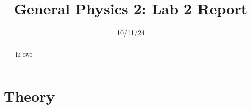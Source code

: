 \documentclass[11pt, letterpaper]{report}
\title{General Physics 2: Lab 2 Report}
\date{10/11/24}
\begin{document}
\maketitle
\begin{abstract}
	hi owo
\end{abstract}
\section{Theory}
\end{document}
